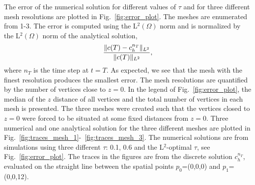 The error of the numerical solution for different values of $\tau$ and for three different mesh resolutions are plotted in Fig.~\ref{fig:error_plot}. The meshes are enumerated from 1-3. The error is computed using the L$^2(\Omega)$ norm and is normalized by the L$^2(\Omega)$ norm of the analytical solution,
\begin{equation}
  \label{eq:error_norm}
  \frac{\|c(T)-c_h^{n_T}\|_{L^2}}{\|c(T)\|_{L^2}},
\end{equation}
where $n_T$ is the time step at $t=T$. As expected, we see that the mesh with the finest resolution produces the smallest error. The mesh resolutions are quantified by the number of vertices close to $z=0$. In the legend of Fig.~\ref{fig:error_plot}, the median of the $z$ distance of all vertices and the total number of vertices in each mesh is presented. The three meshes were created such that the vertices closed to $z=0$ were forced to be situated at some fixed distances from $z=0$. Three numerical and one analytical solution for the three different meshes are plotted in Fig.~\ref{fig:traces_mesh_1}-~\ref{fig:traces_mesh_3}. The numerical solutions are from simulations using three different $\tau$: 0.1, 0.6 and the L$^2$-optimal $\tau$, see Fig.~\ref{fig:error_plot}. The traces in the figures are from the discrete solution $c_h^{n_T}$, evaluated on the straight line between the spatial points $p_0$=(0,0,0) and $p_1$=(0,0,12). \par

\newcommand{\captiontwo}{The figures show the concentration traces of the numerical solutions from Mesh 2, see legend of Fig.~\ref{fig:error_plot}, for three different $\tau$ together with the analytic solution. The solution traces in the two panels are picked from a line going between the spatial points (0,0,0) and (0,0,1.5), for the left panel, and between spatial points (0,0,10.5) and (0,0,12), for the right panel. We see from both panels that the solution with $\tau=0.10$ give the poorest solution. The solution with $\tau=0.28$ was the solution with smallest global error for this mesh, see Fig~\ref{fig:error_plot}, and this is reflected in the reasonable good fit seen in the left panel, especially at $z=0$nm. The solution with $\tau=0.60$ undershoots the analytic solution at $z=0$ with \~1.2 $\mu$M. From the right panel we see that all numerical solutions undershoot at $z=15$nm, and that the trace with $\tau=0.60$ comes the closest to the analytic solution.}


